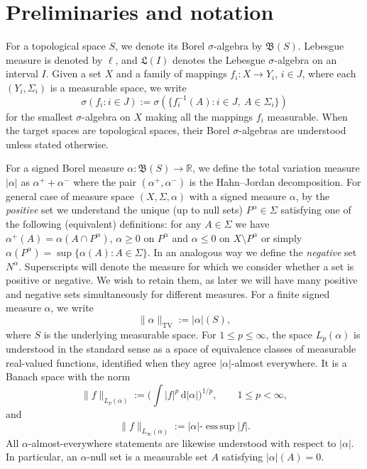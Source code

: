 \documentclass[reqno]{amsart}
\theoremstyle{plain}
\numberwithin{equation}{section}
\numberwithin{definition}{section}
\newcommand\RR{\ensuremath{\mathbb{R}}}
\newcommand{\dd}{\ensuremath{\mathrm{d}}}
\begin{document}
\section{Preliminaries and notation} 
\label{sec:Preliminaries}
\smallskip\par
For a topological space $S$, we denote its Borel
$\sigma$-algebra by $\mathfrak{B}(S)$. Lebesgue measure is denoted by $\ell$, and $\mathfrak{L}(I)$ denotes the Lebesgue $\sigma$-algebra
on an interval $I$. Given a set $X$ and a family of mappings
$f_i:X\to Y_i$, $i\in J$, where each $(Y_i,\Sigma_i)$
is a measurable space, we write
\begin{equation*}
    \sigma(f_i:i\in J)
    :=
    \sigma(
        \{f_i^{-1}(A):i\in J,\ A\in\Sigma_i\}
    )
\end{equation*}
for the smallest $\sigma$-algebra on $X$ making
all the mappings $f_i$ measurable.
When the target spaces are topological spaces,
their Borel $\sigma$-algebras are understood
unless stated otherwise.

For a signed Borel measure $\alpha:\mathfrak{B}(S)\to\RR$, we define the total variation measure $|\alpha|$ as $\alpha^++\alpha^-$ where the pair $(\alpha^+,\alpha^-)$ is the Hahn\nobreakdash--\hspace{0pt}Jordan decomposition. For general case of measure space $(X,\Sigma,\alpha)$ with a signed measure $\alpha$, by the \emph{positive} set we understand the unique (up to null sets) $P^{\alpha}\in\Sigma$ satisfying one of the following (equivalent) definitions:  for any $A\in\Sigma$ we have $\alpha^{+}(A)=\alpha(A\cap P^{\alpha})$, $\alpha\ge 0$ on $P^{\alpha}$ and $\alpha\le 0$ on $X\setminus P^{\alpha}$ or simply  $\alpha(P^{\alpha})=\sup\{\alpha(A):A\in\Sigma\}$. In an analogous way we define the \emph{negative} set $N^{\alpha}$. Superscripts will denote the measure for which we consider whether a set is positive or negative. We wish to retain them, as later we will have many positive and negative sets simultaneously for different measures.
For a finite signed measure $\alpha$, we write
\begin{equation*}
    \|\alpha\|_{\mathrm{TV}}:=|\alpha|(S),
\end{equation*}
where $S$ is the underlying measurable space.
For $1\leq p\leq\infty$, the space $L_p(\alpha)$ is
understood in the standard sense as a space of equivalence
classes of measurable real-valued functions, identified
when they agree $|\alpha|$-almost everywhere.
It is a Banach space with the norm
\begin{equation*}
    \|f\|_{L_p(\alpha)}
    :=
    \Big(\int |f|^p\,\dd|\alpha|\Big)^{1/p},
    \qquad 1\leq p<\infty,
\end{equation*}
and
\begin{equation*}
    \|f\|_{L_\infty(\alpha)}
    :=
    |\alpha|\text{-}\operatorname*{ess\,sup}|f|.
\end{equation*}
All $\alpha$-almost-everywhere statements are likewise
understood with respect to $|\alpha|$.
In particular, an $\alpha$-null set is a measurable
set $A$ satisfying $|\alpha|(A)=0$.
\end{document}
